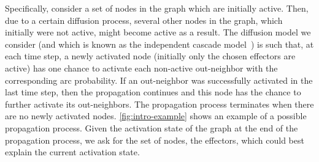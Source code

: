 \documentclass{article}
\begin{document}
Specifically,
consider a set of nodes in the graph which are initially active.
Then,
due to a certain diffusion process,
several other nodes in the graph,
which initially were not active,
might become active as a result.
The diffusion model we consider
(and which is known as the independent cascade model~\cite{KKT15})
is such that,
at each time step,
a newly activated node
(initially only the chosen effectors are active)
has one chance to activate each non-active out-neighbor with the corresponding arc probability.
If an out-neighbor was successfully activated in the last time step,
then the propagation continues and this node has the chance to further activate its out-neighbors.
The propagation process terminates when there are no newly activated nodes.
\autoref{fig:intro-example} shows an example of a possible propagation process.
Given the activation state of the graph at the end of the propagation process,
we ask for the set of nodes, the effectors, which could best explain the current activation state.
\end{document}
